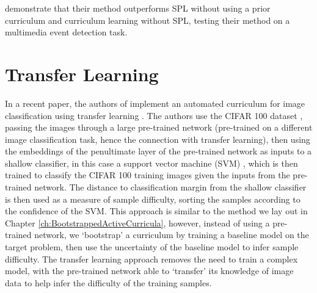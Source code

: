 demonstrate that their method outperforms SPL without using a prior curriculum and curriculum learning without SPL, testing their method on a multimedia event detection task.
\section{Transfer Learning}
In a recent paper, the authors of \cite{weinshall2018curriculum} implement an automated curriculum for image classification using transfer learning \cite{pan2010survey}. The authors use the CIFAR 100 dataset \cite{krizhevsky2009learning}, passing the images through a large pre-trained network (pre-trained on a different image classification task, hence the connection with transfer learning), then using the embeddings of the penultimate layer of the pre-trained network as inputs to a shallow classifier, in this case a support vector machine (SVM) \cite{hearst1998support}, which is then trained to classify the CIFAR 100 training images given the inputs from the pre-trained network. The distance to classification margin from the shallow classifier is then used as a measure of sample difficulty, sorting the samples according to the confidence of the SVM. This approach is similar to the method we lay out in Chapter \ref{ch:BootstrappedActiveCurricula}, however, instead of using a pre-trained network, we `bootstrap' a curriculum by training a baseline model on the target problem, then use the uncertainty of the baseline model to infer sample difficulty. The transfer learning approach removes the need to train a complex model, with the pre-trained network able to `transfer' its knowledge of image data to help infer the difficulty of the training samples. 
